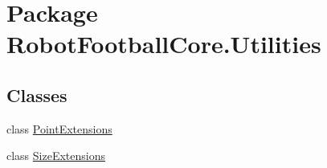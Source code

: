 \hypertarget{namespace_robot_football_core_1_1_utilities}{\section{Package Robot\-Football\-Core.\-Utilities}
\label{namespace_robot_football_core_1_1_utilities}
}
\subsection*{Classes}
\begin{DoxyCompactItemize}
\item 
class \hyperlink{class_robot_football_core_1_1_utilities_1_1_point_extensions}{Point\-Extensions}
\item 
class \hyperlink{class_robot_football_core_1_1_utilities_1_1_size_extensions}{Size\-Extensions}
\end{DoxyCompactItemize}

